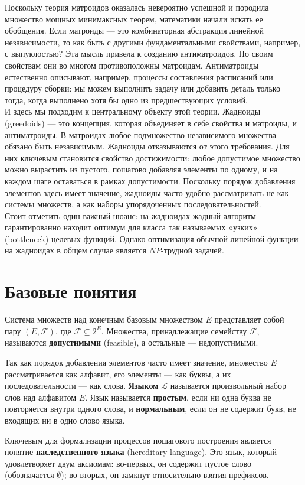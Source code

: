 Поскольку теория матроидов оказалась невероятно успешной и породила множество мощных минимаксных теорем, математики начали искать ее обобщения. Если матроиды — это комбинаторная абстракция линейной независимости, то как быть с другими фундаментальными свойствами, например, с выпуклостью? Эта мысль привела к созданию антиматроидов. По своим свойствам они во многом противоположны матроидам.  Антиматроиды естественно описывают, например, процессы составления расписаний  или процедуру сборки: мы можем выполнить задачу или добавить деталь только тогда, когда выполнено хотя бы одно из предшествующих условий. \\
И здесь мы подходим к центральному объекту этой теории. Жадноиды (greedoids) — это концепция, которая объединяет в себе свойства и матроиды, и антиматроиды. В матроидах любое подмножество независимого множества обязано быть независимым. Жадноиды отказываются от этого требования. Для них ключевым становится свойство достижимости: любое допустимое множество можно вырастить из пустого, пошагово добавляя элементы по одному, и на каждом шаге оставаться в рамках допустимости. Поскольку порядок добавления элементов здесь имеет значение, жадноиды часто удобно рассматривать не как системы множеств, а как наборы упорядоченных последовательностей. \\
Стоит отметить один важный нюанс: на жадноидах жадный алгоритм гарантированно находит оптимум для класса так называемых «узких» (bottleneck) целевых функций. Однако оптимизация обычной линейной функции на жадноидах в общем случае является $NP$-трудной задачей.

\section{Базовые понятия}
Система множеств над конечным базовым множеством $E$ представляет собой пару $(E, \mathcal{F})$, где $\mathcal{F} \subseteq 2^E$. Множества, принадлежащие семейству $\mathcal{F}$, называются \textbf{допустимыми} (feasible), а остальные — недопустимыми. 

Так как порядок добавления элементов часто имеет значение, множество $E$ рассматривается как алфавит, его элементы — как буквы, а их последовательности — как слова. \textbf{Языком} $\mathcal{L}$ называется произвольный набор слов над алфавитом $E$. Язык называется \textbf{простым}, если ни одна буква не повторяется внутри одного слова, и \textbf{нормальным}, если он не содержит букв, не входящих ни в одно слово языка. 

Ключевым для формализации процессов пошагового построения является понятие \textbf{наследственного языка} (hereditary language). Это язык, который удовлетворяет двум аксиомам: во-первых, он содержит пустое слово (обозначается $\emptyset$); во-вторых, он замкнут относительно взятия префиксов. 

